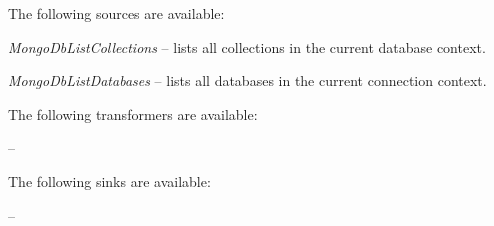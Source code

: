 \documentclass[a4paper]{book}
\begin{document}
The following sources are available:
\begin{tight_itemize}
  \item \textit{MongoDbListCollections} -- lists all collections in the current
  database context.
  \item \textit{MongoDbListDatabases} -- lists all databases in the current
  connection context.
\end{tight_itemize}

The following transformers are available:
\begin{tight_itemize}
  \item \textit{} --
\end{tight_itemize}

The following sinks are available:
\begin{tight_itemize}
  \item \textit{} --
\end{tight_itemize}



\end{document}
